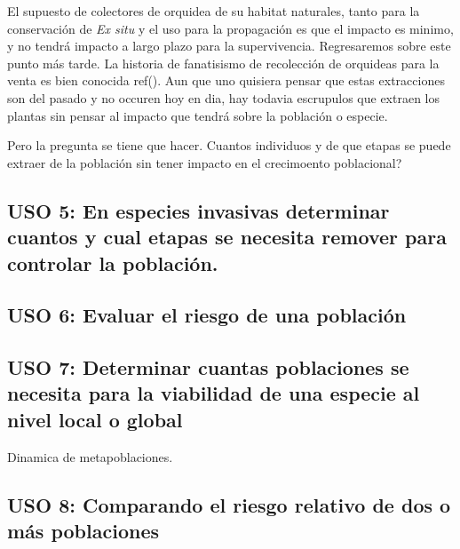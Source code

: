 \documentclass[
]{book}
\theoremstyle{definition}
\theoremstyle{definition}
\theoremstyle{definition}
\theoremstyle{definition}
\theoremstyle{remark}
\begin{document}
El supuesto de colectores de orquidea de su habitat naturales, tanto para la conservación de \emph{Ex situ} y el uso para la propagación es que el impacto es minimo, y no tendrá impacto a largo plazo para la supervivencia. Regresaremos sobre este punto más tarde. La historia de fanatisismo de recolección de orquideas para la venta es bien conocida ref(). Aun que uno quisiera pensar que estas extracciones son del pasado y no occuren hoy en dia, hay todavia escrupulos que extraen los plantas sin pensar al impacto que tendrá sobre la población o especie.

Pero la pregunta se tiene que hacer. Cuantos individuos y de que etapas se puede extraer de la población sin tener impacto en el crecimoento poblacional?

\hypertarget{uso-5-en-especies-invasivas-determinar-cuantos-y-cual-etapas-se-necesita-remover-para-controlar-la-poblaciuxf3n.}{%
\subsection{USO 5: En especies invasivas determinar cuantos y cual etapas se necesita remover para controlar la población.}\label{uso-5-en-especies-invasivas-determinar-cuantos-y-cual-etapas-se-necesita-remover-para-controlar-la-poblaciuxf3n.}}

\hypertarget{uso-6-evaluar-el-riesgo-de-una-poblaciuxf3n}{%
\subsection{USO 6: Evaluar el riesgo de una población}\label{uso-6-evaluar-el-riesgo-de-una-poblaciuxf3n}}

\hypertarget{uso-7-determinar-cuantas-poblaciones-se-necesita-para-la-viabilidad-de-una-especie-al-nivel-local-o-global}{%
\subsection{USO 7: Determinar cuantas poblaciones se necesita para la viabilidad de una especie al nivel local o global}\label{uso-7-determinar-cuantas-poblaciones-se-necesita-para-la-viabilidad-de-una-especie-al-nivel-local-o-global}}

Dinamica de metapoblaciones.

\hypertarget{uso-8-comparando-el-riesgo-relativo-de-dos-o-muxe1s-poblaciones}{%
\subsection{USO 8: Comparando el riesgo relativo de dos o más poblaciones}\label{uso-8-comparando-el-riesgo-relativo-de-dos-o-muxe1s-poblaciones}}
\end{document}
